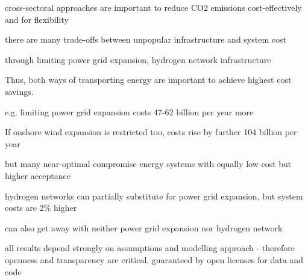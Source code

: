 cross-sectoral approaches are important to reduce CO2 emissions cost-effectively and for flexibility

there are many trade-offs between unpopular infrastructure and system cost

through limiting power grid expansion, hydrogen network infrastructure

Thus, both ways of transporting energy are important to achieve highest
cost savings.

e.g. limiting power grid expansion costs 47-62 billion per year more

If onshore wind expansion is restricted too, costs rise by further 104 billion per year

but many near-optimal compromise energy systems with equally low cost but higher acceptance

hydrogen networks can partially substitute for power grid expansion, but system costs are
2\% higher

can also get away with neither power grid expansion nor hydrogen network

all results depend strongly on assumptions and modelling approach
- therefore openness and transparency are critical, guaranteed by open licenses for data and code
